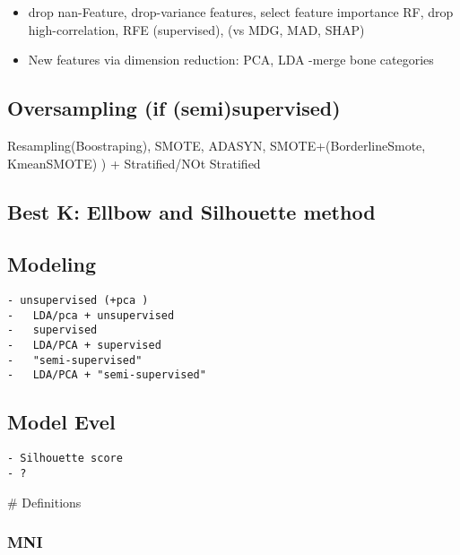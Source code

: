 \documentclass[
  letterpaper,
  DIV=11,
  numbers=noendperiod]{scrartcl}
\providecommand{\tightlist}{%
  \setlength{\itemsep}{0pt}\setlength{\parskip}{0pt}}\usepackage{longtable,booktabs,array}
\begin{document}
\begin{itemize}
\tightlist
\item
  drop nan-Feature, drop-variance features, select feature importance
  RF, drop high-correlation, RFE (supervised), (vs MDG, MAD, SHAP)
\item
  New features via dimension reduction: PCA, LDA -merge bone categories
\end{itemize}

\hypertarget{oversampling-if-semisupervised}{%
\subsection{Oversampling (if
(semi)supervised)}\label{oversampling-if-semisupervised}}

Resampling(Boostraping), SMOTE, ADASYN, SMOTE+(BorderlineSmote,
KmeanSMOTE) ) + Stratified/NOt Stratified

\hypertarget{best-k-ellbow-and-silhouette-method}{%
\subsection{Best K: Ellbow and Silhouette
method}\label{best-k-ellbow-and-silhouette-method}}

\hypertarget{modeling}{%
\subsection{Modeling}\label{modeling}}

\begin{verbatim}
- unsupervised (+pca )
-   LDA/pca + unsupervised
-   supervised
-   LDA/PCA + supervised
-   "semi-supervised"
-   LDA/PCA + "semi-supervised"
\end{verbatim}

\hypertarget{model-evel}{%
\subsection{Model Evel}\label{model-evel}}

\begin{verbatim}
- Silhouette score
- ?
\end{verbatim}

\# Definitions

\hypertarget{mni}{%
\subsubsection{MNI}\label{mni}}
\end{document}
